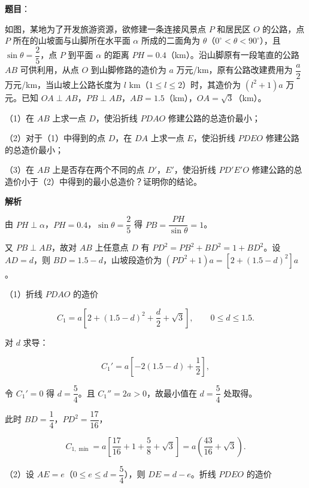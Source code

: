 \begin{answer}

\textbf{题目}：

如图，某地为了开发旅游资源，欲修建一条连接风景点 $P$ 和居民区 $O$ 的公路，点 $P$ 所在的山坡面与山脚所在水平面 $\alpha$ 所成的二面角为 $\theta$（$0^\circ<\theta<90^\circ$），且 $\sin\theta=\dfrac25$，点 $P$ 到平面 $\alpha$ 的距离 $PH=0.4$（km）。沿山脚原有一段笔直的公路 $AB$ 可供利用，从点 $O$ 到山脚修路的造价为 $a$ 万元/km，原有公路改建费用为 $\dfrac a2$ 万元/km，当山坡上公路长度为 $l$ km（$1\leqslant l\leqslant2$）时，其造价为 $(l^2+1)a$ 万元。已知 $OA\perp AB$，$PB\perp AB$，$AB=1.5$（km），$OA=\sqrt3$（km）。

（1）在 $AB$ 上求一点 $D$，使沿折线 $PDAO$ 修建公路的总造价最小；

（2）对于（1）中得到的点 $D$，在 $DA$ 上求一点 $E$，使沿折线 $PDEO$ 修建公路的总造价最小；

（3）在 $AB$ 上是否存在两个不同的点 $D'$，$E'$，使沿折线 $PD'E'O$ 修建公路的总造价小于（2）中得到的最小总造价？证明你的结论。
\nopagebreak[4]
\begin{center}\end{center}
\nopagebreak[4]
\textbf{解析}

由 $PH\perp\alpha$，$PH=0.4$，$\sin\theta=\dfrac25$ 得 $PB=\dfrac{PH}{\sin\theta}=1$。

又 $PB\perp AB$，故对 $AB$ 上任意点 $D$ 有 $PD^2=PB^2+BD^2=1+BD^2$。设 $AD=d$，则 $BD=1.5-d$，山坡段造价为 $(PD^2+1)a=\left[2+(1.5-d)^2\right]a$。

（1）折线 $PDAO$ 的造价

\nopagebreak[4]
\[C_1=a\left[2+(1.5-d)^2+\frac d2+\sqrt3\right],\qquad 0\leqslant d\leqslant1.5.\]

对 $d$ 求导：

\nopagebreak[4]
\[C_1'=a\left[-2(1.5-d)+\frac12\right],\]

令 $C_1'=0$ 得 $d=\dfrac54$。且 $C_1''=2a>0$，故最小值在 $d=\dfrac54$ 处取得。

此时 $BD=\dfrac14$，$PD^2=\dfrac{17}{16}$，

\nopagebreak[4]
\[C_{1,\min}=a\left[\frac{17}{16}+1+\frac58+\sqrt3\right]=a\left(\frac{43}{16}+\sqrt3\right).\]

（2）设 $AE=e$（$0\leqslant e\leqslant d=\dfrac54$），则 $DE=d-e$。折线 $PDEO$ 的造价


\end{answer}
